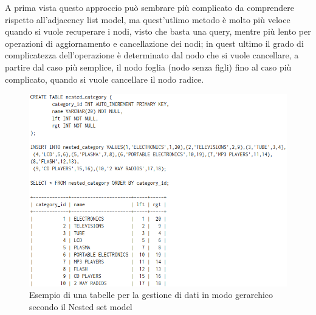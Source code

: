 A prima vista questo approccio può sembrare più complicato da comprendere rispetto all'adjacency list model, ma quest'utlimo metodo è
molto più veloce quando si vuole recuperare i nodi, visto che basta una query, mentre più lento per operazioni di aggiornamento e 
cancellazione dei nodi; in quest ultimo il grado di complicatezza dell'operazione è determinato dal nodo che si vuole cancellare, a 
partire dal caso più semplice, il nodo foglia (nodo senza figli) fino al caso più complicato, quando si vuole cancellare il nodo radice. \\

\begin{figure}[ht!]
    \centering
	\includegraphics[scale=0.6]{images/Nested_Tree_Model_table.PNG}
	\caption{Esempio di una tabelle per la gestione di dati in modo gerarchico secondo il Nested set model}
\end{figure}

\newpage

